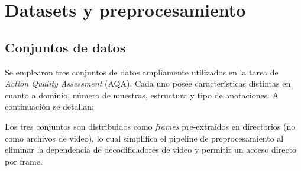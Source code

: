 \section{Datasets y preprocesamiento}
\label{sec:datasets}

\subsection{Conjuntos de datos}

Se emplearon tres conjuntos de datos ampliamente utilizados en la tarea de \textit{Action Quality Assessment} (AQA). Cada uno posee características distintas en cuanto a dominio, número de muestras, estructura y tipo de anotaciones. A continuación se detallan:

Los tres conjuntos son distribuidos como \textit{frames} pre-extraídos en directorios (no como archivos de video), lo cual simplifica el pipeline de preprocesamiento al eliminar la dependencia de decodificadores de video y permitir un acceso directo por frame.

